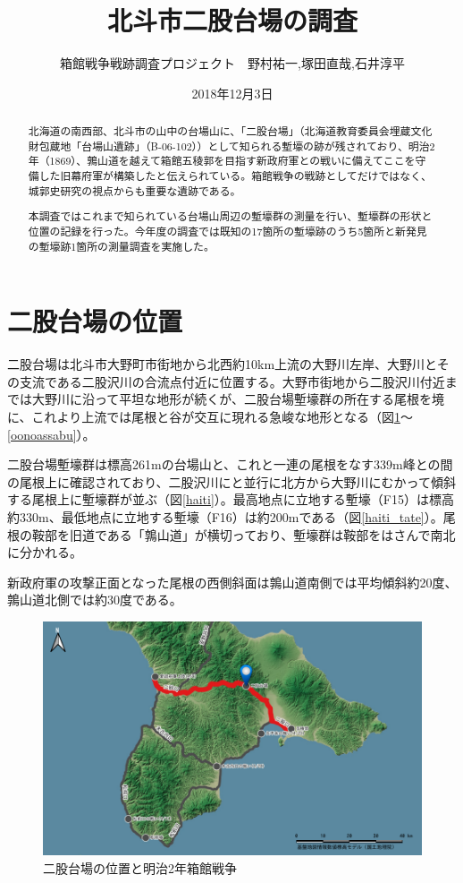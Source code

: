 \documentclass[14Q]{jsarticle}
\title{北斗市二股台場の調査}%
\date{2018年12月3日}
\author{箱館戦争戦跡調査プロジェクト　野村祐一,塚田直哉,石井淳平}              %
\begin{document}
\maketitle
\begin{abstract}
北海道の南西部、北斗市の山中の台場山に、「二股台場」（北海道教育委員会埋蔵文化財包蔵地「台場山遺跡」（B-06-102））として知られる塹壕の跡が残されており、明治2年（1869）、鶉山道を越えて箱館五稜郭を目指す新政府軍との戦いに備えてここを守備した旧幕府軍が構築したと伝えられている。箱館戦争の戦跡としてだけではなく、城郭史研究の視点からも重要な遺跡である。

本調査ではこれまで知られている台場山周辺の塹壕群の測量を行い、塹壕群の形状と位置の記録を行った。今年度の調査では既知の17箇所の塹壕跡のうち5箇所と新発見の塹壕跡1箇所の測量調査を実施した。
\end{abstract}

\section{二股台場の位置}
二股台場は北斗市大野町市街地から北西約10km上流の大野川左岸、大野川とその支流である二股沢川の合流点付近に位置する。大野市街地から二股沢川付近までは大野川に沿って平坦な地形が続くが、二股台場塹壕群の所在する尾根を境に、これより上流では尾根と谷が交互に現れる急峻な地形となる（図\ref{dounan}〜\ref{oonoassabu}）。

二股台場塹壕群は標高261mの台場山と、これと一連の尾根をなす339m峰との間の尾根上に確認されており、二股沢川にと並行に北方から大野川にむかって傾斜する尾根上に塹壕群が並ぶ（図\ref{haiti}）。最高地点に立地する塹壕（F15）は標高約330m、最低地点に立地する塹壕（F16）は約200mである（図\ref{haiti_tate}）。尾根の鞍部を旧道である「鶉山道」が横切っており、塹壕群は鞍部をはさんで南北に分かれる。

新政府軍の攻撃正面となった尾根の西側斜面は鶉山道南側では平均傾斜約20度、鶉山道北側では約30度である。

\begin{figure}[h]
\centering
\includegraphics[width=160truemm]{fig/dounan.pdf}
\caption{二股台場の位置と明治2年箱館戦争}
\label{dounan}
\end{figure}
\end{document}
